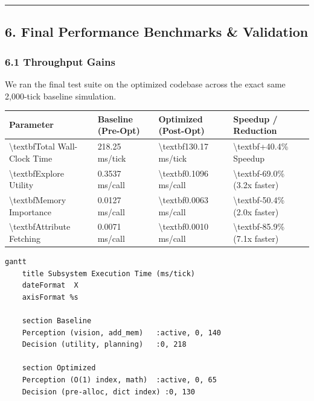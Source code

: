 \documentclass[11pt,a4paper]{article}
\begin{document}
\noindent\rule{\textwidth}{0.4pt}

\subsection*{6. Final Performance Benchmarks \& Validation}

\subsubsection*{6.1 Throughput Gains}
We ran the final test suite on the optimized codebase across the exact same 2,000-tick baseline simulation.

\begin{longtable}{llll}
\toprule
Parameter & Baseline (Pre-Opt) & Optimized (Post-Opt) & Speedup / Reduction \\
\midrule
\endhead
\textbackslash{}textbf{Total Wall-Clock Time} & 218.25 ms/tick & \textbackslash{}textbf{130.17 ms/tick} & \textbackslash{}textbf{+40.4\% Speedup}  \\
\textbackslash{}textbf{Explore Utility} & 0.3537 ms/call & \textbackslash{}textbf{0.1096 ms/call} & \textbackslash{}textbf{-69.0\% (3.2x faster)}  \\
\textbackslash{}textbf{Memory Importance} & 0.0127 ms/call & \textbackslash{}textbf{0.0063 ms/call} & \textbackslash{}textbf{-50.4\% (2.0x faster)}  \\
\textbackslash{}textbf{Attribute Fetching} & 0.0071 ms/call & \textbackslash{}textbf{0.0010 ms/call} & \textbackslash{}textbf{-85.9\% (7.1x faster)}  \\
\bottomrule
\end{longtable}

\begin{lstlisting}[language=mermaid]
gantt
    title Subsystem Execution Time (ms/tick)
    dateFormat  X
    axisFormat %s
    
    section Baseline
    Perception (vision, add_mem)   :active, 0, 140
    Decision (utility, planning)   :0, 218
    
    section Optimized
    Perception (O(1) index, math)  :active, 0, 65
    Decision (pre-alloc, dict index) :0, 130
\end{lstlisting}
\end{document}

